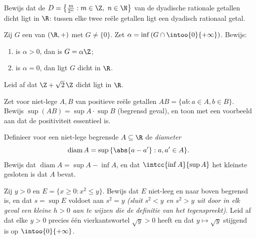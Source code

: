 \begin{exercise}[$\star\star$]\label{exo:b1:reals:8}
Bewijs dat de  $D = \bigl\{\frac{m}{2^n} : m \in \Z,\ n \in
\N\bigr\}$ van de dyadische rationale getallen dicht ligt in $\R$: tussen
elke twee reële getallen ligt een dyadisch rationaal getal.
\end{exercise}

\begin{exercise}[$\star\star\star$]\label{exo:b1:reals:9}
Zij $G$ een  van $(\R, +)$ met $G \neq \{0\}$. Zet $\alpha =
\inf\,(G \cap \intoo{0}{+\infty})$. Bewijs:
\begin{enumerate}
  \item is $\alpha > 0$, dan is $G = \alpha\Z$;
  \item is $\alpha = 0$, dan ligt $G$ dicht in $\R$.
\end{enumerate}
Leid af dat $\Z + \sqrt 2\,\Z$ dicht ligt in $\R$.
\end{exercise}

\begin{exercise}[$\star\star\star$]\label{exo:b1:reals:10}
Zet voor niet-lege  $A, B$ van positieve reële getallen $AB
= \{ab : a \in A, b \in B\}$. Bewijs $\sup(AB) = \sup A \cdot \sup B$
(begrensd geval), en toon met een voorbeeld aan dat de positiviteit
essentieel is.
\end{exercise}

\begin{exercise}[$\star\star$]\label{exo:b1:reals:11}
Definieer voor een niet-lege begrensde $A \subseteq \R$ de
\emph{diameter}
\[
\operatorname{diam} A = \sup\,\{\abs{a - a'} : a, a' \in A\} .
\]
Bewijs dat $\operatorname{diam} A = \sup A - \inf A$, en dat
$\intcc{\inf A}{\sup A}$ het kleinste gesloten  is dat $A$ bevat.
\end{exercise}

\begin{exercise}[$\star\star\star$]\label{exo:b1:reals:12}
Zij $y > 0$ en $E = \{x \geq 0 : x^2 \leq y\}$. Bewijs dat $E$ niet-leeg
en naar boven begrensd is, en dat $s = \sup E$ voldoet aan $s^2 = y$
\emph{(sluit $s^2 < y$ en $s^2 > y$ uit door in elk geval een kleine $h >
0$ aan te wijzen die de definitie van het  tegenspreekt)}. Leid
af dat elke $y > 0$ precies één vierkantswortel $\sqrt y > 0$ heeft en
dat $y \mapsto \sqrt y$ stijgend is op $\intoo{0}{+\infty}$.
\end{exercise}

